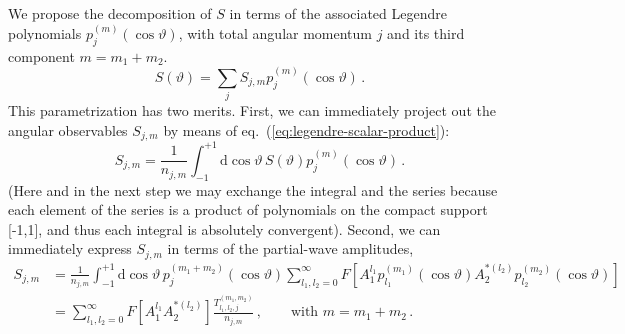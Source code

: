 \documentclass[aps,prd,reprint,nofootinbib,preprintnumbers]{revtex4}
\newcommand{\refeq}[1]{eq.~(\ref{eq:#1})}
\newcommand{\rmdx}[1]{\mbox{d} #1 \,} %
\renewcommand{\theta}{\vartheta}
\begin{document}
We propose the decomposition of $S$ in terms of the associated Legendre polynomials $p_{j}^{(m)}(\cos\theta)$, with total angular momentum $j$ and its third component $m=m_1 + m_2$.
\begin{equation}
    S(\theta) = \sum_j S_{j,m} p_{j}^{(m)}(\cos\theta)\,.
\end{equation}
This parametrization has two merits. First, we can immediately project out the angular observables $S_{j,m}$ by means of \refeq{legendre-scalar-product}:
\begin{equation}
    S_{j,m} = \frac{1}{n_{j,m}} \int_{-1}^{+1} \rmdx{\cos\theta} S(\theta) p_{j}^{(m)}(\cos\theta)\,.
\end{equation}
(Here and in the next step we may exchange the integral and the
series because each element of the series is a product of
polynomials on the compact support [-1,1], and thus each integral
is absolutely convergent).
Second, we can immediately express $S_{j,m}$ in terms of
the partial-wave amplitudes,
\begin{equation}
    \label{eq:partial-wave-observable-infinite}
    \begin{aligned}
        S_{j,m}
            & = \frac{1}{n_{j,m}} \int_{-1}^{+1} \rmdx{\cos\theta} p_{j}^{(m_1 + m_2)}(\cos\theta) \sum_{l_1,l_2=0}^\infty F\left[A_{1}^{l_1} p_{l_1}^{(m_1)}(\cos\theta) A_{2}^{*(l_2)}p_{l_2}^{(m_2)}(\cos\theta)\right]\\
            & = \sum_{l_1,l_2=0}^\infty F\left[A_{1}^{l_1} A_{2}^{*(l_2)}\right] \frac{T_{l_1,l_2,j}^{(m_1,m_2)}}{n_{j,m}}\,,\qquad\text{with }m = m_1 + m_2\,.
    \end{aligned}
\end{equation}
\end{document}
